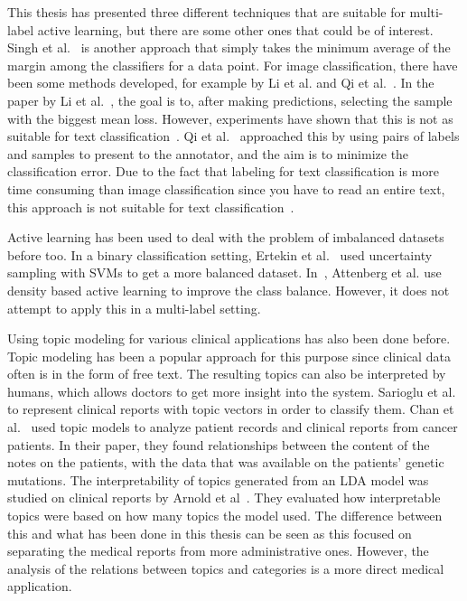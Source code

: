 This thesis has presented three different techniques that are suitable for multi-label active learning, but there are some other ones that could be of interest.
Singh et al\@.~\cite{singh2009active} is another approach that simply takes the minimum average of the margin among the classifiers for a data point.
For image classification, there have been some methods developed, for example by Li et al\@. and Qi et al\@.~\cite{li2004multilabel, qi2008two}.
In the paper by Li et al\@.~\cite{li2004multilabel}, the goal is to, after making predictions, selecting the sample with the biggest mean loss.
However, experiments have shown that this is not as suitable for text classification~\cite{yang2009effective}.
Qi et al\@.~\cite{qi2008two} approached this by using pairs of labels and samples to present to the annotator, and the aim is to minimize the classification error.
Due to the fact that labeling for text classification is more time consuming than image classification since you have to read an entire text, this approach is not suitable for text classification~\cite{yang2009effective}.

Active learning has been used to deal with the problem of imbalanced datasets before too.
In a binary classification setting, Ertekin et al\@.~\cite{ertekin2007learning} used uncertainty sampling with SVMs to get a more balanced dataset.
In~\cite{attenberg2013class}, Attenberg et al\@. use density based active learning to improve the class balance.
However, it does not attempt to apply this in a multi-label setting.

Using topic modeling for various clinical applications has also been done before.
Topic modeling has been a popular approach for this purpose since clinical data often is in the form of free text.
The resulting topics can also be interpreted by humans, which allows doctors to get more insight into the system.
Sarioglu et al\@.~\cite{sarioglu2013topic} to represent clinical reports with topic vectors in order to classify them.
Chan et al\@.~\cite{chan2013empirical} used topic models to analyze patient records and clinical reports from cancer patients.
In their paper, they found relationships between the content of the notes on the patients, with the data that was available on the patients' genetic mutations.
The interpretability of topics generated from an LDA model was studied on clinical reports by Arnold et al~\cite{arnold2016evaluating}.
They evaluated how interpretable topics were based on how many topics the model used.
The difference between this and what has been done in this thesis can be seen as this focused on separating the medical reports from more administrative ones.
However, the analysis of the relations between topics and categories is a more direct medical application.


